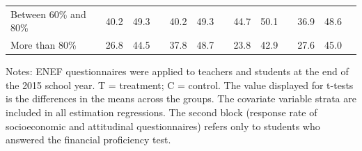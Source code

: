 \documentclass[
	article,			%
	12pt,				%
	oneside,			%
	a4paper,			%
	]{article}
\begin{document}
\begin{table}[h!]
\begin{tabular}{lcccccccccccc}
Between 60\% and 80\% &       40.2 &       49.3 &            &       40.2 &       49.3 &            &       44.7 &       50.1 &            &       36.9 &       48.6 \\

More than 80\% &       26.8 &       44.5 &            &       37.8 &       48.7 &            &       23.8 &       42.9 &            &       27.6 &       45.0 \\

\hline
\end{tabular}  


\begin{tablenotes}
\fontsize{9}{9}\selectfont 
\item  Notes: ENEF questionnaires were applied to teachers and students at the end of the 2015 school year. T = treatment; C = control. The value displayed for t-tests is the differences in the means across the groups. The covariate variable strata are included in all estimation regressions. The second block (response rate of socioeconomic and attitudinal questionnaires) refers only to students who answered the financial proficiency test. 

\end{tablenotes}
\label{tab:implementation}%
\end{table}%

\end{document}
